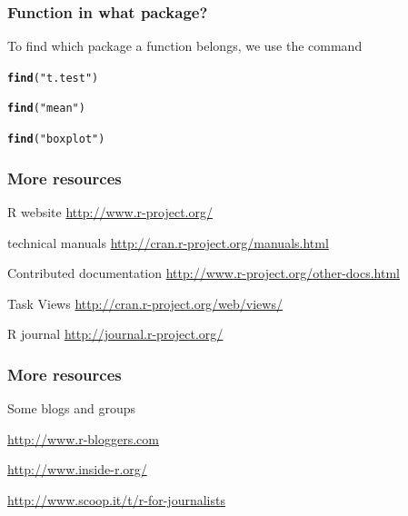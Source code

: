 \documentclass[12pt]{beamer}\usepackage[]{graphicx}\usepackage[]{color}
\makeatletter
\newcommand{\hlstr}[1]{\textcolor[rgb]{0.192,0.494,0.8}{#1}}%
\newcommand{\hlstd}[1]{\textcolor[rgb]{0.345,0.345,0.345}{#1}}%
\newcommand{\hlkwd}[1]{\textcolor[rgb]{0.737,0.353,0.396}{\textbf{#1}}}%
\newenvironment{kframe}{%
 \def\at@end@of@kframe{}%
 \ifinner\ifhmode%
  \def\at@end@of@kframe{\end{minipage}}%
  \begin{minipage}{\columnwidth}%
 \fi\fi%
 \def\FrameCommand##1{\hskip\@totalleftmargin \hskip-\fboxsep
 \colorbox{shadecolor}{##1}\hskip-\fboxsep
     \hskip-\linewidth \hskip-\@totalleftmargin \hskip\columnwidth}%
 \MakeFramed {\advance\hsize-\width
   \@totalleftmargin\z@ \linewidth\hsize
   \@setminipage}}%
 {\par\unskip\endMakeFramed%
 \at@end@of@kframe}
\newenvironment{knitrout}{}{} %
\makeatother
\begin{document}

\begin{frame}[fragile]
\frametitle{Function in what package?}

To find which package a function belongs, we use the command {\hilit {}}
\begin{knitrout}\footnotesize
{}\color{fgcolor}\begin{kframe}
\begin{alltt}
\hlkwd{find}\hlstd{(}\hlstr{"t.test"}\hlstd{)}

\hlkwd{find}\hlstd{(}\hlstr{"mean"}\hlstd{)}

\hlkwd{find}\hlstd{(}\hlstr{"boxplot"}\hlstd{)}
\end{alltt}
\end{kframe}
\end{knitrout}

\end{frame}


\begin{frame}
\frametitle{More resources}

\bi
  \item R website \url{http://www.r-project.org/}
  \item technical manuals \url{http://cran.r-project.org/manuals.html}
  \item Contributed documentation \url{http://www.r-project.org/other-docs.html}
  \item Task Views \url{http://cran.r-project.org/web/views/}
  \item R journal \url{http://journal.r-project.org/}
\ei

\end{frame}


\begin{frame}
\frametitle{More resources}

Some blogs and groups
\bi
  \item \url{http://www.r-bloggers.com}
  \item \url{http://www.inside-r.org/}
  \item \url{http://www.scoop.it/t/r-for-journalists}
\ei

\end{frame}

\end{document}
